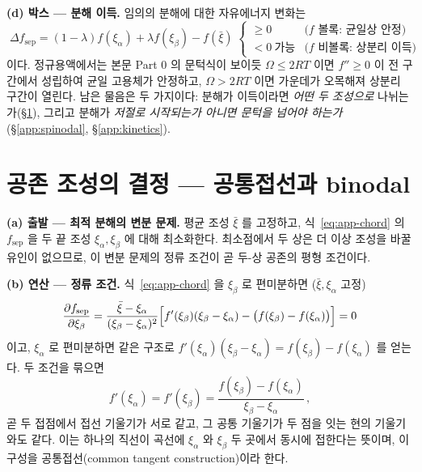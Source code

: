 \documentclass[11pt,a4paper]{article}
\begin{document}
\textbf{(d) 박스 --- 분해 이득.} 임의의 분해에 대한 자유에너지 변화는
\begin{equation}
\boxed{\;\Delta f_\mathrm{sep}=(1-\lambda)f(\xi_\alpha)+\lambda f(\xi_\beta)-f(\bar\xi)
\;\begin{cases}\ge0 &\text{($f$ 볼록: 균일상 안정)}\\[2pt]
<0\ \text{가능} &\text{($f$ 비볼록: 상분리 이득)}\end{cases}}
\label{eq:app-gain}
\end{equation}
이다. 정규용액에서는 본문 Part 0 의 문턱식이 보이듯 $\Omega\le2RT$ 이면 $f''\ge0$ 이 전 구간에서
성립하여 균일 고용체가 안정하고, $\Omega>2RT$ 이면 가운데가 오목해져 상분리 구간이 열린다. 남은
물음은 두 가지이다: 분해가 이득이라면 \emph{어떤 두 조성으로} 나뉘는가(\S\ref{app:binodal}), 그리고
분해가 \emph{저절로 시작되는가 아니면 문턱을 넘어야 하는가}(\S\ref{app:spinodal},
\S\ref{app:kinetics}).

\section{공존 조성의 결정 --- 공통접선과 binodal}\label{app:binodal}

\textbf{(a) 출발 --- 최적 분해의 변분 문제.} 평균 조성 $\bar\xi$ 를 고정하고, 식~\eqref{eq:app-chord}
의 $f_\mathrm{sep}$ 을 두 끝 조성 $\xi_\alpha,\xi_\beta$ 에 대해 최소화한다. 최소점에서 두 상은 더
이상 조성을 바꿀 유인이 없으므로, 이 변분 문제의 정류 조건이 곧 두-상 공존의 평형 조건이다.

\textbf{(b) 연산 --- 정류 조건.} 식~\eqref{eq:app-chord} 을 $\xi_\beta$ 로 편미분하면
($\bar\xi,\xi_\alpha$ 고정)
\begin{equation}
\frac{\partial f_\mathrm{sep}}{\partial\xi_\beta}
=\frac{\bar\xi-\xi_\alpha}{(\xi_\beta-\xi_\alpha)^2}
\Bigl[f'(\xi_\beta)(\xi_\beta-\xi_\alpha)-\bigl(f(\xi_\beta)-f(\xi_\alpha)\bigr)\Bigr]=0
\label{eq:app-statA}
\end{equation}
이고, $\xi_\alpha$ 로 편미분하면 같은 구조로
$f'(\xi_\alpha)(\xi_\beta-\xi_\alpha)=f(\xi_\beta)-f(\xi_\alpha)$ 를 얻는다. 두 조건을 묶으면
\begin{equation}
f'(\xi_\alpha)=f'(\xi_\beta)=\frac{f(\xi_\beta)-f(\xi_\alpha)}{\xi_\beta-\xi_\alpha}\,,
\label{eq:app-ct}
\end{equation}
곧 두 접점에서 접선 기울기가 서로 같고, 그 공통 기울기가 두 점을 잇는 현의 기울기와도 같다. 이는
하나의 직선이 곡선에 $\xi_\alpha$ 와 $\xi_\beta$ 두 곳에서 동시에 접한다는 뜻이며, 이 구성을
공통접선(common tangent construction)이라 한다.
\end{document}
